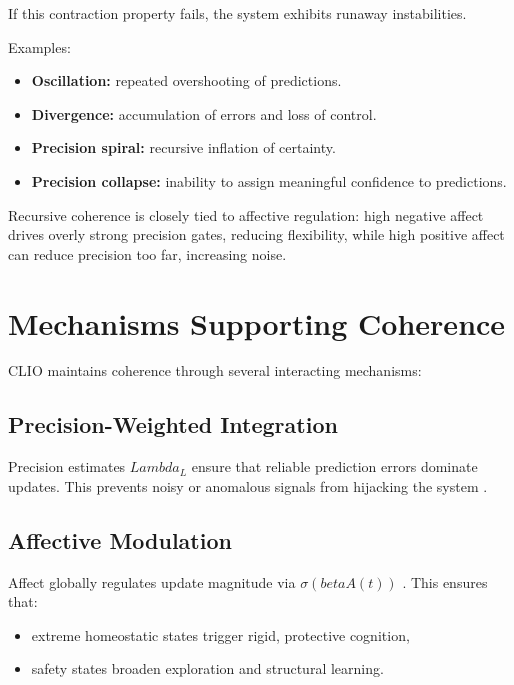 \documentclass[12pt,oneside]{book}
\theoremstyle{plain}
\theoremstyle{definition}
\let\citep\parencite
\def\beta{beta}%
\def\Lambda{Lambda}%
\begin{document}
If this contraction property fails, the system exhibits runaway instabilities.

Examples:

\begin{itemize}
    \item \textbf{Oscillation:}
    repeated overshooting of predictions.

    \item \textbf{Divergence:}
    accumulation of errors and loss of control.

    \item \textbf{Precision spiral:}
    recursive inflation of certainty.

    \item \textbf{Precision collapse:}
    inability to assign meaningful confidence to predictions.
\end{itemize}

Recursive coherence is closely tied to affective regulation:
high negative affect drives overly strong precision gates, reducing flexibility,
while high positive affect can reduce precision too far, increasing noise.

\section{Mechanisms Supporting Coherence}

CLIO maintains coherence through several interacting mechanisms:

\subsection{Precision-Weighted Integration}

Precision estimates $\Lambda_L$ ensure that reliable prediction errors dominate
updates.
This prevents noisy or anomalous signals from hijacking the system
\citep{bogacz2017tutorial}.

\subsection{Affective Modulation}

Affect globally regulates update magnitude via $\sigma(\beta A(t))$
\citep{solms2021hidden}.
This ensures that:

\begin{itemize}
    \item extreme homeostatic states trigger rigid, protective cognition,
    \item safety states broaden exploration and structural learning.
\end{itemize}
\end{document}
